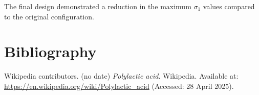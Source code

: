 \documentclass[12pt]{article}
\begin{document}
The final design demonstrated a reduction in the maximum $\sigma_1$ values compared to the original configuration. 
\newpage

\section{Bibliography}

\begin{thebibliography}{9}

Wikipedia contributors. (no date) \textit{Polylactic acid}. Wikipedia. Available at: \url{https://en.wikipedia.org/wiki/Polylactic_acid} (Accessed: 28 April 2025).
    
\end{thebibliography}
\end{document}
